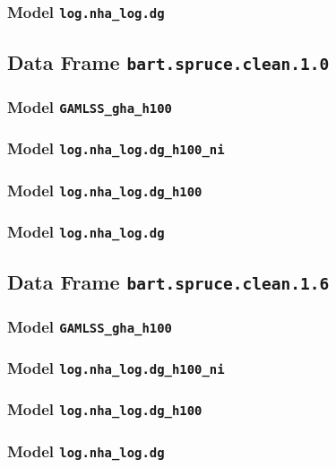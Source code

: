 \subsubsection{Model \texttt{log.nha\_log.dg}}


\subsection{Data Frame \texttt{bart.spruce.clean.1.0}}
\subsubsection{Model \texttt{GAMLSS\_gha\_h100}}

\subsubsection{Model \texttt{log.nha\_log.dg\_h100\_ni}}

\subsubsection{Model \texttt{log.nha\_log.dg\_h100}}

\subsubsection{Model \texttt{log.nha\_log.dg}}


\subsection{Data Frame \texttt{bart.spruce.clean.1.6}}
\subsubsection{Model \texttt{GAMLSS\_gha\_h100}}

\subsubsection{Model \texttt{log.nha\_log.dg\_h100\_ni}}

\subsubsection{Model \texttt{log.nha\_log.dg\_h100}}

\subsubsection{Model \texttt{log.nha\_log.dg}}


